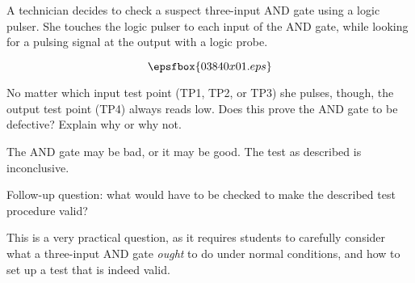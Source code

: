

A technician decides to check a suspect three-input AND gate using a logic pulser.  She touches the logic pulser to each input of the AND gate, while looking for a pulsing signal at the output with a logic probe.

$$\epsfbox{03840x01.eps}$$

No matter which input test point (TP1, TP2, or TP3) she pulses, though, the output test point (TP4) always reads low.  Does this prove the AND gate to be defective?  Explain why or why not.







The AND gate may be bad, or it may be good.  The test as described is inconclusive.

\vskip 10pt

Follow-up question: what would have to be checked to make the described test procedure valid?







This is a very practical question, as it requires students to carefully consider what a three-input AND gate {\it ought} to do under normal conditions, and how to set up a test that is indeed valid.




